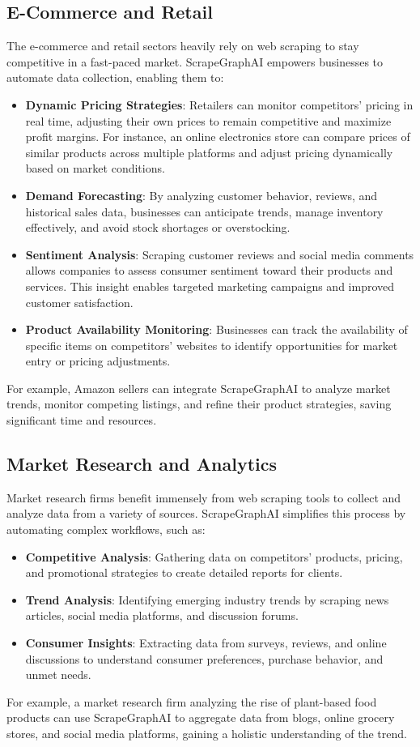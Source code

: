 \subsection{E-Commerce and Retail}
The e-commerce and retail sectors heavily rely on web scraping to stay competitive in a fast-paced market. ScrapeGraphAI empowers businesses to automate data collection, enabling them to:
\begin{itemize}
    \item \textbf{Dynamic Pricing Strategies}: Retailers can monitor competitors’ pricing in real time, adjusting their own prices to remain competitive and maximize profit margins. For instance, an online electronics store can compare prices of similar products across multiple platforms and adjust pricing dynamically based on market conditions.
    \item \textbf{Demand Forecasting}: By analyzing customer behavior, reviews, and historical sales data, businesses can anticipate trends, manage inventory effectively, and avoid stock shortages or overstocking.
    \item \textbf{Sentiment Analysis}: Scraping customer reviews and social media comments allows companies to assess consumer sentiment toward their products and services. This insight enables targeted marketing campaigns and improved customer satisfaction.
    \item \textbf{Product Availability Monitoring}: Businesses can track the availability of specific items on competitors’ websites to identify opportunities for market entry or pricing adjustments.
\end{itemize}
For example, Amazon sellers can integrate ScrapeGraphAI to analyze market trends, monitor competing listings, and refine their product strategies, saving significant time and resources.

\subsection{Market Research and Analytics}
Market research firms benefit immensely from web scraping tools to collect and analyze data from a variety of sources. ScrapeGraphAI simplifies this process by automating complex workflows, such as:
\begin{itemize}
    \item \textbf{Competitive Analysis}: Gathering data on competitors’ products, pricing, and promotional strategies to create detailed reports for clients.
    \item \textbf{Trend Analysis}: Identifying emerging industry trends by scraping news articles, social media platforms, and discussion forums.
    \item \textbf{Consumer Insights}: Extracting data from surveys, reviews, and online discussions to understand consumer preferences, purchase behavior, and unmet needs.
\end{itemize}
For example, a market research firm analyzing the rise of plant-based food products can use ScrapeGraphAI to aggregate data from blogs, online grocery stores, and social media platforms, gaining a holistic understanding of the trend.

